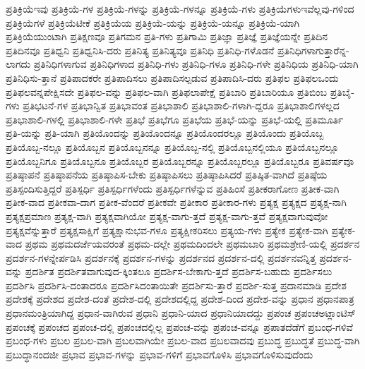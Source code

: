 {ಪ್ರತಿಕ್ರಿಯೆಇವು
ಪ್ರತಿಕ್ರಿಯೆ-ಗಳ
ಪ್ರತಿಕ್ರಿಯೆ-ಗಳನ್ನು
ಪ್ರತಿಕ್ರಿಯೆ-ಗಳನ್ನೂ
ಪ್ರತಿಕ್ರಿಯೆ-ಗಳು
ಪ್ರತಿಕ್ರಿಯೆಗಳುಇವೆಲ್ಲವು-ಗಳಿಂದ
ಪ್ರತಿಕ್ರಿಯೆಗಳೆ
ಪ್ರತಿಕ್ರಿಯೆಟೀಕೆ
ಪ್ರತಿಕ್ರಿಯೆಯ
ಪ್ರತಿಕ್ರಿಯೆ-ಯನ್ನು
ಪ್ರತಿಕ್ರಿಯೆ-ಯನ್ನೂ
ಪ್ರತಿಕ್ರಿಯೆ-ಯಾಗಿ
ಪ್ರತಿಕ್ರಿಯೆಯುಂಟಾಗಿ
ಪ್ರತಿಕ್ಷಣವೂ
ಪ್ರತಿಗಮನ
ಪ್ರತಿ-ಗಳು
ಪ್ರತಿಗಾಮಿ
ಪ್ರತಿಜ್ಞಾ
ಪ್ರತಿಜ್ಞೆ
ಪ್ರತಿಜ್ಞೆಯನ್ನೇ
ಪ್ರತಿದಿನ
ಪ್ರತಿದಿನವೂ
ಪ್ರತಿಧ್ವನಿ
ಪ್ರತಿಧ್ವನಿಸಿ-ದರು
ಪ್ರತಿನಿತ್ಯ
ಪ್ರತಿನಿತ್ಯವೂ
ಪ್ರತಿನಿಧಿ
ಪ್ರತಿನಿಧಿ-ಗಳೊಡನೆ
ಪ್ರತಿನಿಧಿಗಳಾಗುತ್ತಾರೆನ್ನ-ಲಾಗದು
ಪ್ರತಿನಿಧಿಗಳಾಗುವ
ಪ್ರತಿನಿಧಿಗಳಾದ
ಪ್ರತಿನಿಧಿ-ಗಳು
ಪ್ರತಿನಿಧಿ-ಗಳೂ
ಪ್ರತಿನಿಧಿ-ಗಳೇ
ಪ್ರತಿನಿಧಿಯ
ಪ್ರತಿನಿಧಿ-ಯಾಗಿ
ಪ್ರತಿನಿಧಿಸು-ತ್ತಾನೆ
ಪ್ರತಿಪಾದಕರೇ
ಪ್ರತಿಪಾದಿಸಲು
ಪ್ರತಿಪಾದಿಸಲ್ಪಡುವ
ಪ್ರತಿಪಾದಿಸಿ-ದರು
ಪ್ರತಿಫಲ
ಪ್ರತಿಫಲಒಂದು
ಪ್ರತಿಫಲವನ್ನಪೇಕ್ಷಿಸದೇ
ಪ್ರತಿಫಲ-ವನ್ನು
ಪ್ರತಿಫಲ-ವಾಗಿ
ಪ್ರತಿಫಲಾಪೇಕ್ಷೆ
ಪ್ರತಿಬಾರಿ
ಪ್ರತಿಬಾರಿಯೂ
ಪ್ರತಿಬಿಂಬ
ಪ್ರತಿಬೈ-ಗಳು
ಪ್ರತಿಭಟನೆ-ಗಳ
ಪ್ರತಿಭಾನ್ವಿತ
ಪ್ರತಿಭಾವಂತ
ಪ್ರತಿಭಾಶಾಲಿ
ಪ್ರತಿಭಾಶಾಲಿ-ಗಳಾಗಿ-ದ್ದರೂ
ಪ್ರತಿಭಾಶಾಲಿಗಳಲ್ಲದ
ಪ್ರತಿಭಾಶಾಲಿ-ಗಳಲ್ಲಿ
ಪ್ರತಿಭಾಶಾಲಿ-ಗಳೇ
ಪ್ರತಿಭೆ
ಪ್ರತಿಭೆಗೂ
ಪ್ರತಿಭೆಯ
ಪ್ರತಿಭೆ-ಯನ್ನು
ಪ್ರತಿಭೆ-ಯಲ್ಲಿ
ಪ್ರತಿಮೂರ್ತಿ
ಪ್ರತಿ-ಯನ್ನು
ಪ್ರತಿ-ಯಾಗಿ
ಪ್ರತಿಯೊಂದನ್ನು
ಪ್ರತಿಯೊಂದನ್ನೂ
ಪ್ರತಿಯೊಂದರಲ್ಲೂ
ಪ್ರತಿಯೊಂದು
ಪ್ರತಿಯೊಬ್ಬ
ಪ್ರತಿಯೊಬ್ಬ-ನಲ್ಲೂ
ಪ್ರತಿಯೊಬ್ಬನ
ಪ್ರತಿಯೊಬ್ಬನನ್ನೂ
ಪ್ರತಿಯೊಬ್ಬ-ನಲ್ಲಿ
ಪ್ರತಿಯೊಬ್ಬನಲ್ಲಿಯೂ
ಪ್ರತಿಯೊಬ್ಬನಲ್ಲೂ
ಪ್ರತಿಯೊಬ್ಬನಿಗೂ
ಪ್ರತಿಯೊಬ್ಬನೂ
ಪ್ರತಿಯೊಬ್ಬರ
ಪ್ರತಿಯೊಬ್ಬರನ್ನೂ
ಪ್ರತಿಯೊಬ್ಬರಲ್ಲೂ
ಪ್ರತಿಯೊಬ್ಬರೂ
ಪ್ರತಿವರ್ಷವೂ
ಪ್ರತಿಷ್ಠಾಪನೆ
ಪ್ರತಿಷ್ಠಾಪನೆಯ
ಪ್ರತಿಷ್ಠಾಪಿಸ-ಬೇಕು
ಪ್ರತಿಷ್ಠಾಪಿಸಲು
ಪ್ರತಿಷ್ಠಾಪಿಸಿದರೆ
ಪ್ರತಿಷ್ಠಿತ-ವಾಗಿದೆ
ಪ್ರತಿಷ್ಠೆಯ
ಪ್ರತಿಸ್ಪಂದಿಸುತ್ತಿದ್ದರೆ
ಪ್ರತಿಸ್ಪರ್ಧಿ
ಪ್ರತಿಸ್ಪರ್ಧಿಗಳೆಂದು
ಪ್ರತಿಸ್ಪರ್ಧಿಗಳೆನ್ನುವ
ಪ್ರತಿಹಿಂಸೆ
ಪ್ರತೀಕರಾಗೋಣ
ಪ್ರತೀಕ-ವಾಗಿ
ಪ್ರತೀಕ-ವಾದ
ಪ್ರತೀಕವಾ-ದಾಗ
ಪ್ರತೀಕ-ವೆಂದರೆ
ಪ್ರತೀಕವೇ
ಪ್ರತೀಕಾರ
ಪ್ರತೀಕಾರ-ಗಳು
ಪ್ರತ್ಯಕ್ಷ
ಪ್ರತ್ಯಕ್ಷದ
ಪ್ರತ್ಯಕ್ಷ-ನಾಗಿ
ಪ್ರತ್ಯಕ್ಷಪ್ರಮಾಣ
ಪ್ರತ್ಯಕ್ಷ-ವಾಗಿ
ಪ್ರತ್ಯಕ್ಷವಾಗಿಯೋ
ಪ್ರತ್ಯಕ್ಷ-ವಾಗು-ತ್ತದೆ
ಪ್ರತ್ಯಕ್ಷ-ವಾಗು-ತ್ತವೆ
ಪ್ರತ್ಯಕ್ಷವಾಗುವುವೋ
ಪ್ರತ್ಯಕ್ಷವೆನ್ನುತ್ತಾರೆ
ಪ್ರತ್ಯಕ್ಷಸಾಕ್ಷಿಗೆ
ಪ್ರತ್ಯಕ್ಷಾನುಭವ-ಗಳೂ
ಪ್ರತ್ಯಕ್ಷೀಕರಿಸಲು
ಪ್ರತ್ಯಯ-ಗಳು
ಪ್ರತ್ಯೇಕ
ಪ್ರತ್ಯೇಕ-ವಾಗಿ
ಪ್ರತ್ಯೇಕ-ವಾದ
ಪ್ರಥಮ
ಪ್ರಥಮದರ್ಜೆಯವರಂತೆ
ಪ್ರಥಮ-ದಲ್ಲೇ
ಪ್ರಥಮದಿಂದಲೇ
ಪ್ರಥಮಬಾರಿ
ಪ್ರಥಮಶ್ರೇಣಿ-ಯಲ್ಲಿ
ಪ್ರದರ್ಶನ
ಪ್ರದರ್ಶನ-ಗಳನ್ನೇರ್ಪಡಿಸಿ
ಪ್ರದರ್ಶನಕ್ಕೆ
ಪ್ರದರ್ಶನ-ಗಳನ್ನು
ಪ್ರದರ್ಶನದ
ಪ್ರದರ್ಶನ-ದಲ್ಲಿ
ಪ್ರದರ್ಶನವನ್ನಿತ್ತ
ಪ್ರದರ್ಶನ-ವನ್ನು
ಪ್ರದರ್ಶಿತ
ಪ್ರದರ್ಶಿತವಾಗುವುದ-ಕ್ಕಿಂತಲೂ
ಪ್ರದರ್ಶಿಸ-ಬೇಕಾಗು-ತ್ತದೆ
ಪ್ರದರ್ಶಿಸ-ಬಹುದು
ಪ್ರದರ್ಶಿಸಲು
ಪ್ರದರ್ಶಿಸಿ
ಪ್ರದರ್ಶಿಸಿ-ದಂತಾದರೂ
ಪ್ರದರ್ಶಿಸಿದಂತಾಯಿತೇ
ಪ್ರದರ್ಶಿಸು-ತ್ತಾರೆ
ಪ್ರದರ್ಶಿ-ಸುತ್ತ
ಪ್ರದಾನಮಾಡಿ
ಪ್ರದೇಶ
ಪ್ರದೇಶಕ್ಕೆ
ಪ್ರದೇಶದ
ಪ್ರದೇಶ-ದಂತೆ
ಪ್ರದೇಶ-ದಲ್ಲಿ
ಪ್ರದೇಶದಲ್ಲಿದ್ದ
ಪ್ರದೇಶ-ದಿಂದ
ಪ್ರದೇಶ-ವನ್ನು
ಪ್ರಧಾನ
ಪ್ರಧಾನಪಾತ್ರ
ಪ್ರಧಾನಮಂತ್ರಿಯಾಗಿದ್ದ
ಪ್ರಧಾನ-ವಾಗಿರುವ
ಪ್ರಧಾನಿ
ಪ್ರಧಾನಿ-ಯಾದ
ಪ್ರಧಾನಿಯಾದದ್ದು
ಪ್ರಪಂಚ
ಪ್ರಪಂಚಅಟ್ಲಾಂಟಿಸ್
ಪ್ರಪಂಚಕ್ಕೆ
ಪ್ರಪಂಚದ
ಪ್ರಪಂಚ-ದಲ್ಲಿ
ಪ್ರಪಂಚದಲ್ಲಿಲ್ಲ
ಪ್ರಪಂಚ-ವನ್ನು
ಪ್ರಪಂಚ-ವನ್ನೂ
ಪ್ರಪಾತದೆಡೆಗೆ
ಪ್ರಬಂಧ-ಗಳಿವೆ
ಪ್ರಬಂಧ-ಗಳು
ಪ್ರಬಲ
ಪ್ರಬಲ-ವಾಗಿ
ಪ್ರಬಲವಾಗಿಯೇ
ಪ್ರಬಲ-ವಾದ
ಪ್ರಬಲವಾದವು
ಪ್ರಬುದ್ಧ
ಪ್ರಬುದ್ಧತೆ
ಪ್ರಬುದ್ಧ-ವಾಗಿ
ಪ್ರಬುದ್ಧಾನಂದಜೀ
ಪ್ರಭಾವ
ಪ್ರಭಾವ-ಗಳನ್ನು
ಪ್ರಭಾವ-ಗಳಿಗೆ
ಪ್ರಭಾವಗೊಳಿಸಿ
ಪ್ರಭಾವಗೊಳಿಸುವುದೆಂದು
}

